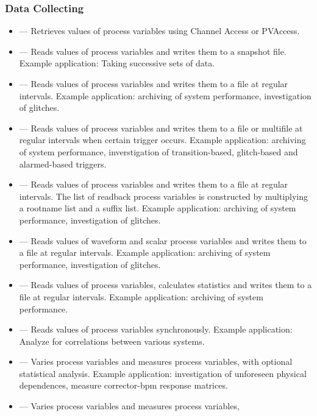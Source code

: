 \documentclass[11pt]{article}
\begin{document}
\subsubsection{Data Collecting}
\begin{itemize}
  \item {} --- Retrieves values of process variables using Channel Access or PVAccess.
  \item {} --- Reads values of process variables and writes them to a snapshot file.
        Example application: Taking successive sets of data.
  \item {} --- Reads values of process variables and writes them to a file at regular intervals.
        Example application: archiving of system performance, investigation of glitches.
  \item {} --- Reads values of process variables and writes them to a file or multifile at regular intervals when certain trigger occurs.
        Example application: archiving of system performance, inverstigation of
        transition-based, glitch-based and alarmed-based triggers.
  \item {} --- Reads values of process variables
        and writes them to a file at regular intervals. The list of readback process
        variables is constructed by multiplying a rootname list and a suffix list.
        Example application: archiving of system performance, investigation of
        glitches.
  \item {} --- Reads values of waveform and scalar process variables and writes them to a file at regular intervals.
        Example application: archiving of system performance, investigation of glitches.
  \item {} --- Reads values of process variables, calculates statistics and writes them to a file at regular intervals.
        Example application: archiving of system performance.
  \item {} --- Reads values of process variables
        synchronously.  Example application: Analyze for correlations
        between various systems.
  \item {} --- Varies process variables and measures process variables,
        with optional statistical analysis.
        Example application:  investigation of unforeseen physical dependences,
        measure corrector-bpm response matrices.
  \item {} --- Varies process variables and measures process variables,

\end{itemize}
\end{document}
